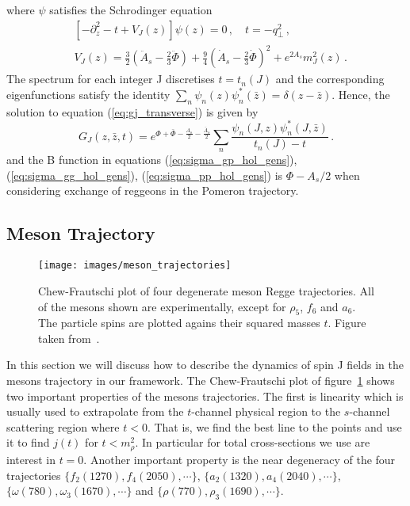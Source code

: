 \documentclass[a4paper,12pt]{article}
\begin{document}
where $\psi$ satisfies the Schrodinger equation
\begin{align}
&\left[ -\partial_z^2 -t + V_J \left(z\right) \right] \psi\left(z\right) = 0 \, , \quad t = - q_\perp^2 \, , \\
&V_J(z) = \frac{3}{2}\left( \ddot{A}_s - \frac{2}{3} \ddot{\Phi} \right) + \frac{9}{4} {\left( \dot{A}_s - \frac{2}{3} \dot{\Phi} \right)}^2 + e^{2 A_s} m_J^2 \left(z\right) \, .
\label{eq:schrodinger_potential_gluon}
\end{align}
The spectrum for each integer J discretises $t = t_n (J)$ and the corresponding eigenfunctions satisfy the identity $\sum_n \psi_n (z) \psi^{*}_n (\bar{z}) = \delta ( z - \bar{z} )$. Hence, the solution to equation (\ref{eq:gj_transverse}) is given by
\begin{equation}
G_J\left(z, \bar{z}, t  \right) = e^{\Phi + \bar{\Phi} - \frac{A_s}{2} - \frac{\bar{A}_s}{2}} \sum_n \frac{\psi_n (J, z) \psi_n^{*} (J, \bar{z})}{t_n (J) - t} \, .
\label{eq:gj_pomeron}
\end{equation}
and the B function in equations (\ref{eq:sigma_gp_hol_gens}), (\ref{eq:sigma_gg_hol_gens}), (\ref{eq:sigma_pp_hol_gens}) is $\Phi - A_s/2$ when considering exchange of reggeons in the Pomeron trajectory.
 
\subsection{Meson Trajectory}

\begin{figure}[!t]
  \center
  \texttt{[image: images/meson\_trajectories]} 
  \caption{Chew-Frautschi plot of four degenerate meson Regge trajectories. All of the mesons shown are experimentally, except for $\rho_5$, $f_6$ and $a_6$. The particle spins are plotted agains their squared masses $t$. Figure taken from~\cite{donnachie_dosch_landshoff_nachtmann_2002}.}
  \label{fig:meson_trajectories}
\end{figure}

In this section we will discuss how to describe the dynamics of spin J fields in the mesons trajectory in our framework. The Chew-Frautschi plot of figure~\ref{fig:meson_trajectories} shows two important properties of the mesons trajectories. The first is linearity which is usually used to extrapolate from the $t$-channel physical region to the $s$-channel scattering region where $t < 0$. That is, we find the best line to the points and use it to find $j(t)$ for $t < m_\rho^2$. In particular for total cross-sections we use are interest in $t = 0$. Another important property is the near degeneracy of the four trajectories $\{ f_2(1270), f_4(2050), \cdots \}$, $\{ a_2(1320), a_4(2040), \cdots \}$, $\{ \omega(780), \omega_3(1670), \cdots \}$ and $\{ \rho(770), \rho_3(1690), \cdots \}$.
\end{document}
